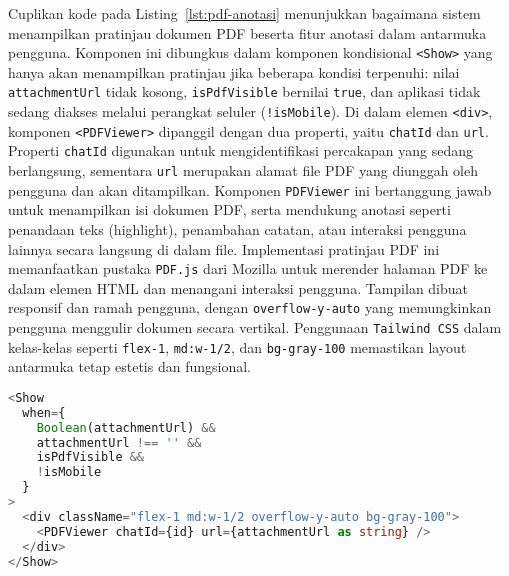 Cuplikan kode pada Listing~\ref{lst:pdf-anotasi} menunjukkan bagaimana sistem menampilkan pratinjau dokumen PDF beserta fitur anotasi dalam antarmuka pengguna. Komponen ini dibungkus dalam komponen kondisional \texttt{<Show>} yang hanya akan menampilkan pratinjau jika beberapa kondisi terpenuhi: nilai \texttt{attachmentUrl} tidak kosong, \texttt{isPdfVisible} bernilai \texttt{true}, dan aplikasi tidak sedang diakses melalui perangkat seluler (\texttt{!isMobile}).
\singlespacing{}
Di dalam elemen \texttt{<div>}, komponen \texttt{<PDFViewer>} dipanggil dengan dua properti, yaitu \texttt{chatId} dan \texttt{url}. Properti \texttt{chatId} digunakan untuk mengidentifikasi percakapan yang sedang berlangsung, sementara \texttt{url} merupakan alamat file PDF yang diunggah oleh pengguna dan akan ditampilkan. Komponen \texttt{PDFViewer} ini bertanggung jawab untuk menampilkan isi dokumen PDF, serta mendukung anotasi seperti penandaan teks (highlight), penambahan catatan, atau interaksi pengguna lainnya secara langsung di dalam file.
\singlespacing{}
Implementasi pratinjau PDF ini memanfaatkan pustaka \texttt{PDF.js} dari Mozilla untuk merender halaman PDF ke dalam elemen HTML dan menangani interaksi pengguna. Tampilan dibuat responsif dan ramah pengguna, dengan \texttt{overflow-y-auto} yang memungkinkan pengguna menggulir dokumen secara vertikal. Penggunaan \texttt{Tailwind CSS} dalam kelas-kelas seperti \texttt{flex-1}, \texttt{md:w-1/2}, dan \texttt{bg-gray-100} memastikan layout antarmuka tetap estetis dan fungsional.
\singlespacing{}
\begin{lstlisting}[language=TypeScript, caption={Pratinjau \textit{PDF} dengan fitur anotasi}, label={lst:pdf-anotasi}]
<Show
  when={
    Boolean(attachmentUrl) &&
    attachmentUrl !== '' &&
    isPdfVisible &&
    !isMobile
  }
>
  <div className="flex-1 md:w-1/2 overflow-y-auto bg-gray-100">
    <PDFViewer chatId={id} url={attachmentUrl as string} />
  </div>
</Show>
\end{lstlisting}